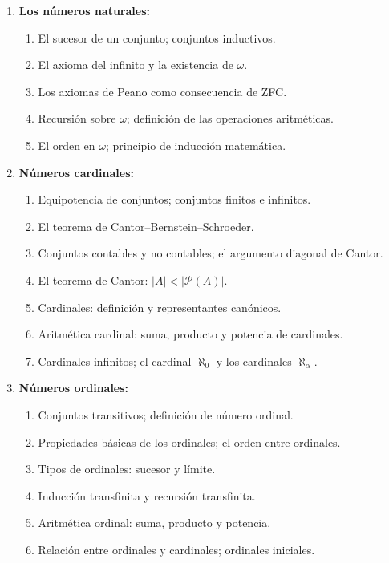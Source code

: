 \begin{refsection}
\begin{enumerate}
\item \textbf{Los números naturales:}
\begin{enumerate}
    \item El sucesor de un conjunto; conjuntos inductivos.
    \item El axioma del infinito y la existencia de $\omega$.
    \item Los axiomas de Peano como consecuencia de ZFC.
    \item Recursión sobre $\omega$; definición de las operaciones aritméticas.
    \item El orden en $\omega$; principio de inducción matemática.
\end{enumerate}

\item \textbf{Números cardinales:}
\begin{enumerate}
    \item Equipotencia de conjuntos; conjuntos finitos e infinitos.
    \item El teorema de Cantor--Bernstein--Schroeder.
    \item Conjuntos contables y no contables; el argumento diagonal de Cantor.
    \item El teorema de Cantor: $|A| < |\mathcal{P}(A)|$.
    \item Cardinales: definición y representantes canónicos.
    \item Aritmética cardinal: suma, producto y potencia de cardinales.
    \item Cardinales infinitos; el cardinal $\aleph_0$ y los cardinales $\aleph_\alpha$.
\end{enumerate}

\item \textbf{Números ordinales:}
\begin{enumerate}
    \item Conjuntos transitivos; definición de número ordinal.
    \item Propiedades básicas de los ordinales; el orden entre ordinales.
    \item Tipos de ordinales: sucesor y límite.
    \item Inducción transfinita y recursión transfinita.
    \item Aritmética ordinal: suma, producto y potencia.
    \item Relación entre ordinales y cardinales; ordinales iniciales.
\end{enumerate}


\end{enumerate}
\end{refsection}
